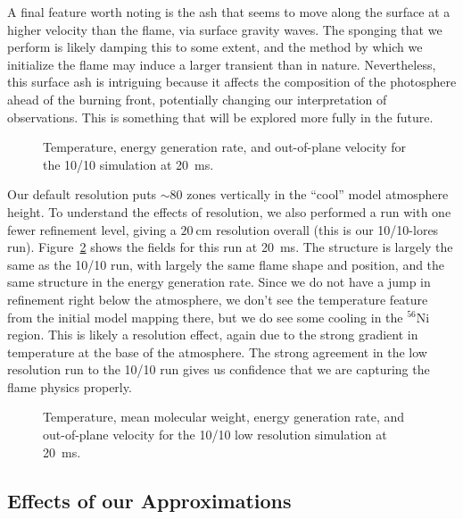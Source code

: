 \documentclass[preprint,times,tighten]{aastex63}
\newcommand{\isot}[2]{$^{#2}\mathrm{#1}$}
\newcommand{\MarginPar}[1]{
    \marginpar{\vskip-\baselineskip%
               \raggedright%
               \tiny\sffamily%
               {\color{red}\hrule%
               \smallskip%
               #1\par%
               \smallskip%
               \hrule}}%
}
\begin{document}
A final feature worth noting is the ash that seems to move along the
surface at a higher velocity than the flame, via surface gravity
waves.  The sponging that we perform is likely damping this to some extent, and
the method by which we initialize the flame may induce a larger
transient than in nature. Nevertheless, this surface ash is intriguing
because it affects the composition of the photosphere ahead of the
burning front, potentially changing our interpretation of
observations.  This is something that will be explored more fully in
the future.

\begin{figure}[t]
\centering
{}
\caption{\label{fig:10_10_overview} Temperature, energy generation rate, and out-of-plane velocity for the 10/10 simulation at 20~ms.}
\end{figure}


Our default resolution puts $\sim 80$ zones vertically in the
``cool'' \MarginPar{double check} model atmosphere height.  To
understand the effects of resolution, we also performed a run with one
fewer refinement level, giving a $20~\mbox{cm}$ resolution overall (this is our
10/10-lores run).  Figure~\ref{fig:10_10_lowres} shows the fields for this run at
20~ms.  The structure is largely the same as the 10/10 run, with
largely the same flame shape and position, and the same structure in
the energy generation rate.  Since we do not have a jump in refinement
right below the atmosphere, we don't see the temperature feature from
the initial model mapping there, but we do see some cooling in the
\isot{Ni}{56} region.  This is likely a resolution effect, again due
to the strong gradient in temperature at the base of the atmosphere.
The strong agreement in the low resolution run to the 10/10 run gives
us confidence that we are capturing the flame physics properly.

\begin{figure}[t]
\centering
{}
\caption{\label{fig:10_10_lowres} Temperature, mean molecular weight,
  energy generation rate, and out-of-plane velocity for the 10/10 low
  resolution simulation at 20~ms.}
\end{figure}




\subsection{Effects of our Approximations}
\end{document}
